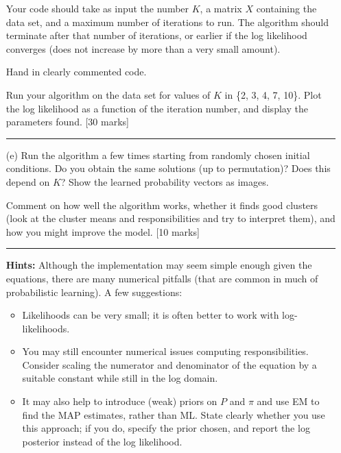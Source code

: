 \documentclass{article}
\begin{document}
\begin{enumerate}
    Your code should take as input the number \( K \), a matrix \( X \) containing the data set, and a maximum number of iterations to run. The algorithm should terminate after that number of iterations, or earlier if the log likelihood converges (does not increase by more than a very small amount). 
   
    Hand in clearly commented code.
   
    Run your algorithm on the data set for values of \( K \) in \{2, 3, 4, 7, 10\}. Plot the log likelihood as a function of the iteration number, and display the parameters found. [30 marks]

    \vspace{10pt}
    \noindent\textcolor{gray}{\rule{0.8\linewidth}{0.4pt}}

    \item[(e)] Run the algorithm a few times starting from randomly chosen initial conditions. Do you obtain the same solutions (up to permutation)? Does this depend on \( K \)? Show the learned probability vectors as images.

    Comment on how well the algorithm works, whether it finds good clusters (look at the cluster means and responsibilities and try to interpret them), and how you might improve the model. [10 marks]

    \vspace{10pt}
    \noindent\textcolor{gray}{\rule{0.8\linewidth}{0.4pt}}

    \textbf{Hints:} Although the implementation may seem simple enough given the equations, there are many numerical pitfalls (that are common in much of probabilistic learning). A few suggestions:
    
    \begin{itemize}
        \item Likelihoods can be very small; it is often better to work with log-likelihoods.
        \item You may still encounter numerical issues computing responsibilities. Consider scaling the numerator and denominator of the equation by a suitable constant while still in the log domain.
        \item It may also help to introduce (weak) priors on \( P \) and \( \pi \) and use EM to find the MAP estimates, rather than ML. State clearly whether you use this approach; if you do, specify the prior chosen, and report the log posterior instead of the log likelihood.
    \end{itemize}
\end{enumerate}
\end{document}

